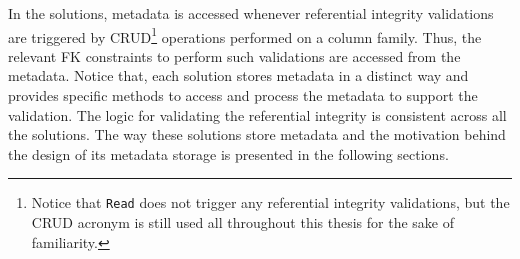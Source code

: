 In the solutions, metadata  is accessed whenever referential integrity
validations are triggered by
\ac{CRUD}\footnote{Notice that \texttt{Read} does not trigger any referential
integrity validations, but the \ac{CRUD} acronym is still used all throughout
this thesis for the sake of familiarity.} operations performed on a column
family. Thus, the relevant \ac{FK} constraints  to perform such validations are
accessed from the metadata. Notice that, each solution stores metadata in a
distinct way and provides specific methods to access and process the metadata to
support the validation. The logic for validating the referential integrity is
consistent across all the solutions. The way these solutions store metadata and
the motivation behind the design of its metadata storage is presented in the
following sections.










